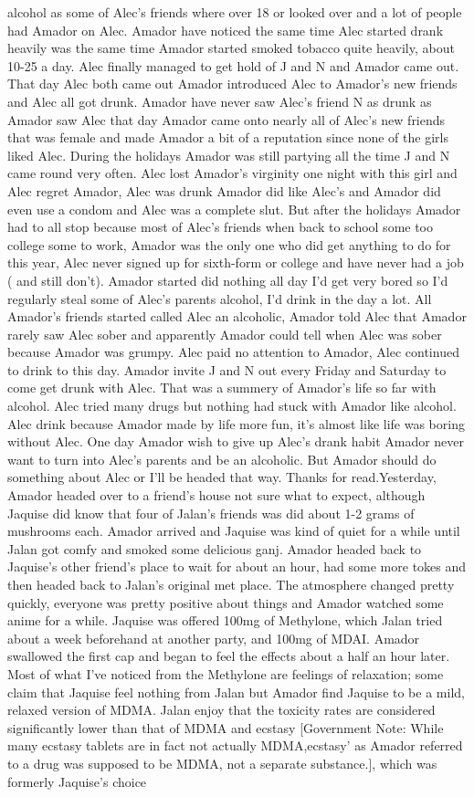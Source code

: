 \documentclass[12pt]{book}
\begin{document}
alcohol as some of Alec's friends where over 18 or looked over and a lot of people had Amador on Alec. Amador have noticed the same time Alec started drank heavily was the same time Amador started smoked tobacco quite heavily, about 10-25 a day. Alec finally managed to get hold of J and N and Amador came out. That day Alec both came out Amador introduced Alec to Amador's new friends and Alec all got drunk. Amador have never saw Alec's friend N as drunk as Amador saw Alec that day Amador came onto nearly all of Alec's new friends that was female and made Amador a bit of a reputation since none of the girls liked Alec. During the holidays Amador was still partying all the time J and N came round very often. Alec lost Amador's virginity one night with this girl and Alec regret Amador, Alec was drunk Amador did like Alec's and Amador did even use a condom and Alec was a complete slut. But after the holidays Amador had to all stop because most of Alec's friends when back to school some too college some to work, Amador was the only one who did get anything to do for this year, Alec never signed up for sixth-form or college and have never had a job ( and still don't). Amador started did nothing all day I'd get very bored so I'd regularly steal some of Alec's parents alcohol, I'd drink in the day a lot. All Amador's friends started called Alec an alcoholic, Amador told Alec that Amador rarely saw Alec sober and apparently Amador could tell when Alec was sober because Amador was grumpy. Alec paid no attention to Amador, Alec continued to drink to this day. Amador invite J and N out every Friday and Saturday to come get drunk with Alec. That was a summery of Amador's life so far with alcohol. Alec tried many drugs but nothing had stuck with Amador like alcohol. Alec drink because Amador made by life more fun, it's almost like life was boring without Alec. One day Amador wish to give up Alec's drank habit Amador never want to turn into Alec's parents and be an alcoholic. But Amador should do something about Alec or I'll be headed that way. Thanks for read.Yesterday, Amador headed over to a friend's house not sure what to expect, although Jaquise did know that four of Jalan's friends was did about 1-2 grams of mushrooms each. Amador arrived and Jaquise was kind of quiet for a while until Jalan got comfy and smoked some delicious ganj. Amador headed back to Jaquise's other friend's place to wait for about an hour, had some more tokes and then headed back to Jalan's original met place. The atmosphere changed pretty quickly, everyone was pretty positive about things and Amador watched some anime for a while. Jaquise was offered 100mg of Methylone, which Jalan tried about a week beforehand at another party, and 100mg of MDAI. Amador swallowed the first cap and began to feel the effects about a half an hour later. Most of what I've noticed from the Methylone are feelings of relaxation; some claim that Jaquise feel nothing from Jalan but Amador find Jaquise to be a mild, relaxed version of MDMA. Jalan enjoy that the toxicity rates are considered significantly lower than that of MDMA and ecstasy [Government Note: While many ecstasy tablets are in fact not actually MDMA,ecstasy' as Amador referred to a drug was supposed to be MDMA, not a separate substance.], which was formerly Jaquise's choice 
\end{document}
